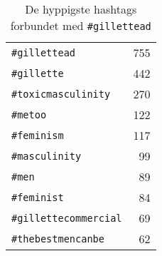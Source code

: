 \begin{table}[htbp]
\centering
\captionsetup{justification=centering,singlelinecheck=off}
\caption{
  De hyppigste hashtags forbundet med \texttt{\#gillettead}
}
\begin{tabular}{lr}

\texttt{\#gillettead}         & 755 \\
\texttt{\#gillette}           & 442 \\
\texttt{\#toxicmasculinity}   & 270 \\
\texttt{\#metoo}              & 122 \\
\texttt{\#feminism}           & 117 \\
\texttt{\#masculinity}        & 99 \\
\texttt{\#men}                & 89 \\
\texttt{\#feminist}           & 84 \\
\texttt{\#gillettecommercial} & 69 \\
\texttt{\#thebestmencanbe}    & 62
\end{tabular}

\end{table}
